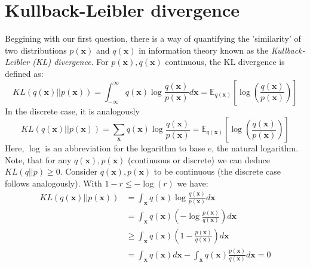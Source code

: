 \documentclass[12pt]{report}
\theoremstyle{definition}
\begin{document}
\section{Kullback-Leibler divergence}
Beggining with our first question, there is a way of quantifying the 'similarity' of two distributions $p(\mathbf{x})$ and $q(\mathbf{x})$ in information theory known as the \emph{Kullback-Leibler (KL) divergence}. For $p(\mathbf{x}), q(\mathbf{x})$ continuous, the KL divergence is defined as:
\begin{equation}
	KL(q(\mathbf{x})||p(\mathbf{x})) = \int_{-\infty}^{\infty} q(\mathbf{x}) \log \frac{q(\mathbf{x})}{p(\mathbf{x})} d \mathbf{x} = \mathbb{E}_{q(\mathbf{x})}\left[ \log\left(\frac{q(\mathbf{x})}{p(\mathbf{x})} \right) \right]
\end{equation}
In the discrete case, it is analogously 
\begin{equation}
	KL(q(\mathbf{x})||p(\mathbf{x})) = \sum_{\mathbf{x}} q(\mathbf{x}) \log \frac{q(\mathbf{x})}{p(\mathbf{x})} = \mathbb{E}_{q(\mathbf{x})}\left[ \log\left(\frac{q(\mathbf{x})}{p(\mathbf{x})} \right) \right]
\end{equation}
Here, $\log$ is an abbreviation for the logarithm to base $e$, the natural logarithm. Note, that for any $q(\mathbf{x}), p(\mathbf{x})$ (continuous or discrete) we can deduce $KL(q||p) \geq 0$.
Consider $q(\mathbf{x}), p(\mathbf{x})$ to be continuous (the discrete case follows analogously). With $1 - r \leq -\log(r)$ we have:
\begin{equation}
\begin{split}
KL(q(\mathbf{x})||p(\mathbf{x})) 
& = \int_{\mathbf{x}} q(\mathbf{x}) \log \frac{q(\mathbf{x})}{p(\mathbf{x})} d \mathbf{x} \\
& = \int_{\mathbf{x}} q(\mathbf{x}) (- \log \frac{p(\mathbf{x})}{q(\mathbf{x})}) d \mathbf{x} \\
& \geq \int_{\mathbf{x}} q(\mathbf{x}) (1 - \frac{p(\mathbf{x})}{q(\mathbf{x})}) d \mathbf{x} \\
& = \int_{\mathbf{x}} q(\mathbf{x}) d \mathbf{x} - \int_{\mathbf{x}} q(\mathbf{x}) \frac{p(\mathbf{x})}{q(\mathbf{x})} d \mathbf{x} = 0 
\end{split}
\end{equation}
\end{document}
